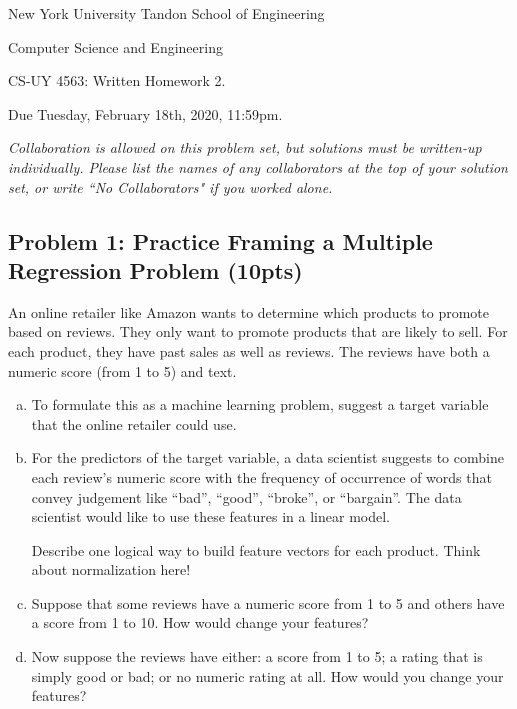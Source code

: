 \documentclass[10pt]{article}
\begin{document}
	
\begin{center}
	\normalsize
	New York University Tandon School of Engineering
	
	Computer Science and Engineering
	\medskip
	
	\large
	CS-UY 4563: Written Homework 2. 
	
	Due Tuesday, February 18th, 2020, 11:59pm.
	\medskip
	
	\normalsize 
	\noindent \emph{Collaboration is allowed on this problem set, but solutions must be written-up individually. Please list the names of any collaborators at the top of your solution set, or write ``No Collaborators" if you worked alone.}
	\medskip
\end{center} 

\subsection{Problem 1: Practice Framing a Multiple Regression Problem (10pts)}
 An online retailer like Amazon wants to determine which products to promote based on reviews. They only want to promote products that are likely to sell. For each product, they have past sales as well as reviews. The reviews have both a numeric score (from 1 to 5) and text.
\begin{enumerate}[(a)]
	\item To formulate this as a machine learning problem, suggest a target variable that the online retailer could use.
	\item For the predictors of the target variable, a data scientist suggests to combine each review's numeric score with the frequency of occurrence of words that convey judgement like ``bad'', ``good'', ``broke'', or ``bargain''. The data scientist would like to use these features in a linear model.
	
	Describe one logical way to build feature vectors for each product. Think about normalization here!
	
	\item Suppose that some reviews have a numeric score from 1 to 5 and others have a score from 1 to 10. How would change your features?
	\item Now suppose the reviews have either:  a score from 1 to 5;  a rating that is simply good or bad; or no numeric rating at all. How would you change your features?
\end{enumerate}
\end{document}
